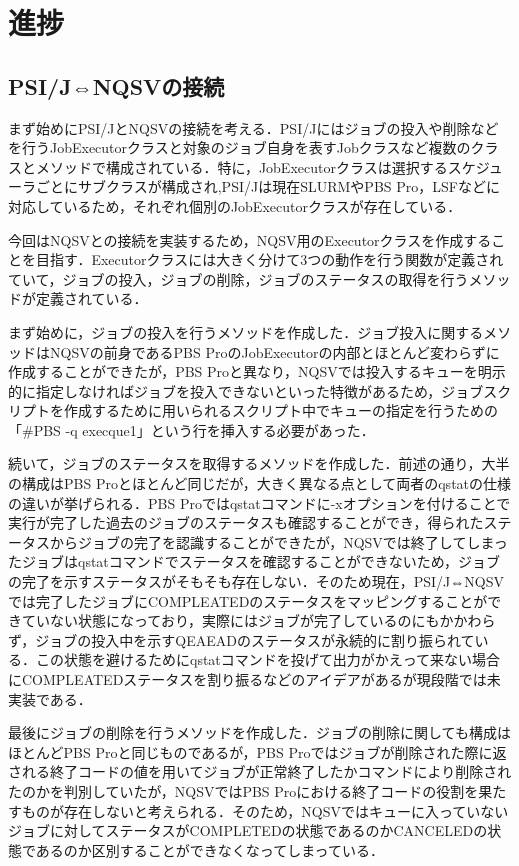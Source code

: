 \documentclass[a4paper,oneside,twocolumn,notitlepage,dvipdfmx]{jsarticle}
\begin{document}
\section{進捗}
\subsection{PSI/J⇔NQSVの接続}
まず始めにPSI/JとNQSVの接続を考える．PSI/Jにはジョブの投入や削除などを行うJobExecutorクラスと対象のジョブ自身を表すJobクラスなど複数のクラスとメソッドで構成されている．特に，JobExecutorクラスは選択するスケジューラごとにサブクラスが構成され,PSI/Jは現在SLURMやPBS Pro，LSFなどに対応しているため，それぞれ個別のJobExecutorクラスが存在している．\par
今回はNQSVとの接続を実装するため，NQSV用のExecutorクラスを作成することを目指す．Executorクラスには大きく分けて3つの動作を行う関数が定義されていて，ジョブの投入，ジョブの削除，ジョブのステータスの取得を行うメソッドが定義されている．\par
まず始めに，ジョブの投入を行うメソッドを作成した．ジョブ投入に関するメソッドはNQSVの前身であるPBS ProのJobExecutorの内部とほとんど変わらずに作成することができたが，PBS Proと異なり，NQSVでは投入するキューを明示的に指定しなければジョブを投入できないといった特徴があるため，ジョブスクリプトを作成するために用いられるスクリプト中でキューの指定を行うための「\#PBS -q execque1」という行を挿入する必要があった．\par
続いて，ジョブのステータスを取得するメソッドを作成した．前述の通り，大半の構成はPBS Proとほとんど同じだが，大きく異なる点として両者のqstatの仕様の違いが挙げられる．PBS Proではqstatコマンドに-xオプションを付けることで実行が完了した過去のジョブのステータスも確認することができ，得られたステータスからジョブの完了を認識することができたが，NQSVでは終了してしまったジョブはqstatコマンドでステータスを確認することができないため，ジョブの完了を示すステータスがそもそも存在しない．そのため現在，PSI/J⇔NQSVでは完了したジョブにCOMPLEATEDのステータスをマッピングすることができていない状態になっており，実際にはジョブが完了しているのにもかかわらず，ジョブの投入中を示すQEAEADのステータスが永続的に割り振られている．この状態を避けるためにqstatコマンドを投げて出力がかえって来ない場合にCOMPLEATEDステータスを割り振るなどのアイデアがあるが現段階では未実装である．\par
最後にジョブの削除を行うメソッドを作成した．ジョブの削除に関しても構成はほとんどPBS Proと同じものであるが，PBS Proではジョブが削除された際に返される終了コードの値を用いてジョブが正常終了したかコマンドにより削除されたのかを判別していたが，NQSVではPBS Proにおける終了コードの役割を果たすものが存在しないと考えられる．そのため，NQSVではキューに入っていないジョブに対してステータスがCOMPLETEDの状態であるのかCANCELEDの状態であるのか区別することができなくなってしまっている．\par
\end{document}
